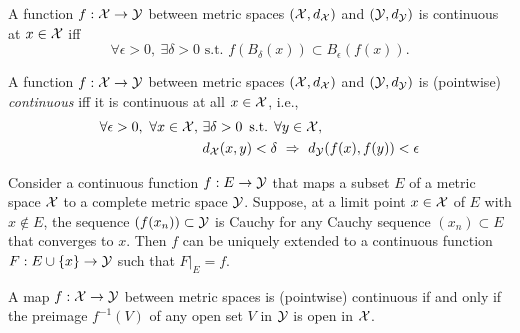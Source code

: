 \begin{lem}
  \label{lem:pointContinuityBall}
  A function $f: {\cal X} \rightarrow {\cal Y}$
  between metric spaces $({\cal X},d_{\cal X})$
  and $({\cal Y}, d_{\cal Y})$
  is continuous at $x\in{\cal X}$ iff 
  \begin{equation}
    \label{eq:pointContinuityBall}
    \forall \epsilon > 0, \ \exists \delta>0 \text{ s.t. }
    f(B_{\delta}(x)) \subset B_{\epsilon}(f(x)).
  \end{equation}
\end{lem}

\begin{defn}
  \label{def:continuousFuncMetricSpace}
  A function $f: {\cal X} \rightarrow {\cal Y}$
  between metric spaces $({\cal X},d_{\cal X})$
  and $({\cal Y}, d_{\cal Y})$
  is (pointwise) \emph{continuous}
  iff it is continuous at all $x\in{\cal X}$,
  i.e., 
  \begin{align}
    \label{eq:continuousFuncMetricSpace}
    \forall \epsilon>0,\ \forall x\in {\cal X},\ 
    & \exists \delta>0\, \text{ s.t. }
    \forall y \in {\cal X},\ \
    \\ \nonumber
    &d_{\cal X}(x,y)<\delta\ \Rightarrow\ d_{\cal Y}(f(x),f(y))<\epsilon
  \end{align}
\end{defn}

\begin{thm}
  \label{thm:continuousExtPoint}
  Consider a continuous function $f: E \rightarrow {\cal Y}$ 
  that maps a subset $E$ of a metric space ${\cal X}$
  to a complete metric space ${\cal Y}$.
  Suppose, at a limit point $x\in {\cal X}$ of $E$ with $x\not\in E$, 
  the sequence $(f(x_n))\subset {\cal Y}$ is Cauchy
  for any Cauchy sequence $(x_n)\subset E$ that converges to $x$. 
  Then $f$ can be uniquely extended to a continuous function
  $F: E\cup\{x\}\rightarrow {\cal Y}$ such that
  $F|_{E} = f$.
\end{thm}

\begin{thm}
  \label{thm:contMapOpenPreimage}
  A map $f:{\cal X}\rightarrow {\cal Y}$ between metric spaces
  is (pointwise) continuous if and only if
  the preimage $f^{-1}(V)$ of any open set $V$ in ${\cal Y}$
  is open in ${\cal X}$.
\end{thm}

